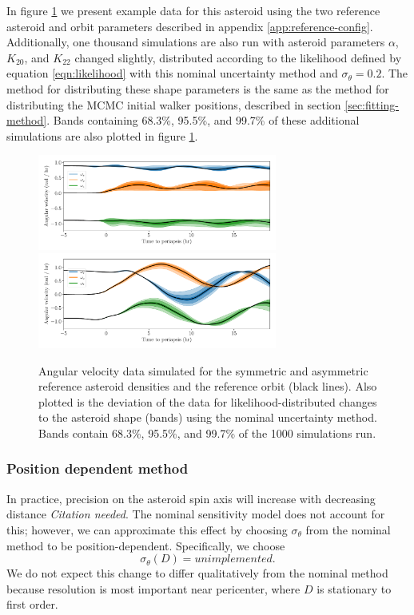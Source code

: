 \documentclass[linenumbers]{aastex631}
\newcommand{\jtd}[1]{{\color{red}\textit{#1}}}
\begin{document}
In figure \ref{fig:example-data} we present example data for this asteroid using the two reference asteroid and orbit parameters described in appendix \ref{app:reference-config}. Additionally, one thousand simulations are also run with asteroid parameters $\alpha$, $K_{20}$, and $K_{22}$ changed slightly, distributed according to the likelihood defined by equation \ref{eqn:likelihood} with this nominal uncertainty method and $\sigma_\theta = 0.2$. The method for distributing these shape parameters is the same as the method for distributing the MCMC initial walker positions, described in section \ref{sec:fitting-method}. Bands containing 68.3\%, 95.5\%, and 99.7\% of these additional simulations are also plotted in figure \ref{fig:example-data}.

\begin{figure}
  \centering
  \includegraphics[width=0.7\textwidth]{nominal-data-sym.pdf}
  \includegraphics[width=0.7\textwidth]{nominal-data-asym.pdf}
  \caption{Angular velocity data simulated for the symmetric and asymmetric reference asteroid densities and the reference orbit (black lines). Also plotted is the deviation of the data for likelihood-distributed changes to the asteroid shape (bands) using the nominal uncertainty method. Bands contain 68.3\%, 95.5\%, and 99.7\% of the 1000 simulations run.}
  \label{fig:example-data}
\end{figure}


\subsubsection{Position dependent method}
In practice, precision on the asteroid spin axis will increase with decreasing distance \jtd{Citation needed}. The nominal sensitivity model does not account for this; however, we can approximate this effect by choosing $\sigma_\theta$ from the nominal method to be position-dependent. Specifically, we choose
\begin{equation}
\sigma_\theta(D) = unimplemented.
\label{eqn:pos-dependent-sensitivity}
\end{equation}
We do not expect this change to differ qualitatively from the nominal method because resolution is most important near pericenter, where $D$ is stationary to first order.
\end{document}
